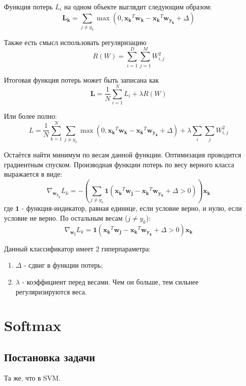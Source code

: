 \documentclass[a4paper]{article}
\newcommand{\wk}{\bm{w_k}}
\newcommand{\xk}{\bm{x_k}}
\begin{document}
Функция потерь $L_i$ на одном объекте выглядит следующим образом:
\begin{equation}
\bm{L_k} = \sum_{j \neq y_k}\max{(0, \xk^T\wk - \xk^T\bm{w_{y_k}} + \Delta)}
\end{equation}

Также есть смысл использовать регуляризацию 
\begin{equation}
R(W) = \sum_{i = 1}^{D}\sum_{j = 1}^M W_{i,j}^2
\end{equation}

Итоговая функция потерь может быть записана как
\begin{equation*}
\bm{L} = \frac{1}{N}\sum_{i = 1}^N L_i + \lambda R(W)
\end{equation*}

Или более полно:
\begin{equation}
L = \frac{1}{N}\sum_{k = 1}^N\sum_{j \neq y_k}\max{(0, \xk^T\wk - \xk^T\bm{w_{y_k}} + \Delta)}  + \lambda\sum_i\sum_j W_{i,j}^2
\end{equation}

Остаётся найти минимум по весам данной функции. Оптимизация проводится градиентным спуском. Производная функции потерь по весу верного класса выражается в виде:
\begin{equation}
\nabla_{\bm{w_{y_k}}} L_k = -\left(\sum_{j \neq y_k} \bm{1}(\xk^T\bm{w_j} - \xk^T\bm{w_{y_k}} + \Delta > 0)\right) \xk
\end{equation}
где $\bm{1}$ - функция-индикатор, равная единице, если условие верно, и нулю, если условие не верно.
По остальным весам ($j \neq y_k$):
\begin{equation}
\nabla_{\bm{w_j}} L_k = \bm{1}(\xk^T\bm{w_j} - \xk^T\bm{w_{y_k}} + \Delta > 0) \xk
\end{equation}

Данный классификатор имеет 2 гиперпараметра:
\begin{enumerate}
\item $\Delta$ - сдвиг в функции потерь;
\item $\lambda$ - коэффициент перед весами. Чем он больше, тем сильнее регуляризируются веса.
\end{enumerate}

\section{Softmax}
\subsection{Постановка задачи}
Та же, что в SVM.
\end{document}
